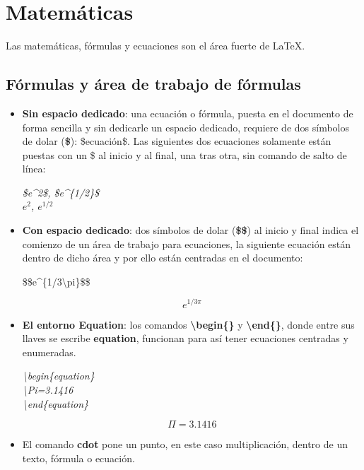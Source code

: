 \section{Matemáticas}
\hspace{0.55cm}Las matemáticas, fórmulas y ecuaciones son el área fuerte de \LaTeX.


\subsection{Fórmulas y área de trabajo de fórmulas}
\begin{itemize}
    \item \textbf{Sin espacio dedicado}: una ecuación o fórmula, puesta en el documento de forma sencilla y sin dedicarle un espacio dedicado, requiere de dos símbolos de dolar (\textbf{\$}): \$ecuación\$. Las siguientes dos ecuaciones solamente están puestas con un \$ al inicio y al final, una tras otra, sin comando de salto de línea:
    \begin{center}
        \textit{
            \$e\textasciicircum{2}\$, \$e\textasciicircum{\{1/2\}}\$ \\
            $e^2$, $e^{1/2}$
        }
    \end{center}
    \item \textbf{Con espacio dedicado}: dos símbolos de dolar (\textbf{\$\$}) al inicio y final indica el comienzo de un área de trabajo para ecuaciones, la siguiente ecuación están dentro de dicho área y por ello están centradas en el documento:
    \begin{center}
        \$\$e\textasciicircum\{1/3\textbackslash{pi}\}\$\$
    \end{center}
    $$e^{1/3\pi}$$
    \item \textbf{El entorno Equation}: los comandos \textbf{\textbackslash{begin\{\}}} y \textbf{\textbackslash{end\{\}}}, donde entre sus llaves se escribe \textbf{equation}, funcionan para así tener ecuaciones centradas y enumeradas.
    \begin{center}
        \textit{
            \textbackslash{begin\{equation\}} \\
            \textbackslash{Pi}=3.1416 \\
            \textbackslash{end\{equation\}}}
    \end{center}
    \begin{equation}
        \label{ec: 3}
        \Pi=3.1416
    \end{equation}
    \item El comando \textbf{cdot} pone un punto, en este caso multiplicación, dentro de un texto, fórmula o ecuación.

\end{itemize}
